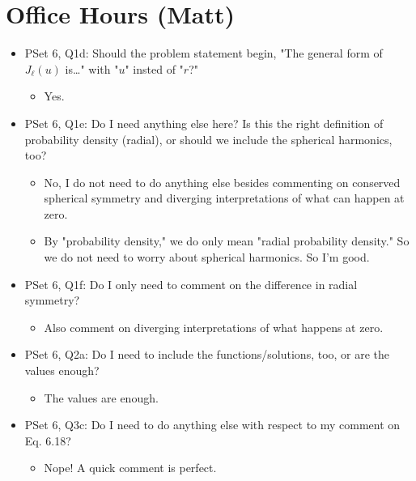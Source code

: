 \documentclass[../notes.tex]{subfiles}
\begin{document}
\section{Office Hours (Matt)}
\begin{itemize}
    \item PSet 6, Q1d: Should the problem statement begin, "The general form of $J_\ell(u)$ is\dots" with "$u$" insted of "$r$?"
    \begin{itemize}
        \item Yes.
    \end{itemize}
    \item PSet 6, Q1e: Do I need anything else here? Is this the right definition of probability density (radial), or should we include the spherical harmonics, too?
    \begin{itemize}
        \item No, I do not need to do anything else besides commenting on conserved spherical symmetry and diverging interpretations of what can happen at zero.
        \item By "probability density," we do only mean "radial probability density." So we do not need to worry about spherical harmonics. So I'm good.
    \end{itemize}
    \item PSet 6, Q1f: Do I only need to comment on the difference in radial symmetry?
    \begin{itemize}
        \item Also comment on diverging interpretations of what happens at zero.
    \end{itemize}
    \item PSet 6, Q2a: Do I need to include the functions/solutions, too, or are the values enough?
    \begin{itemize}
        \item The values are enough.
    \end{itemize}
    \item PSet 6, Q3c: Do I need to do anything else with respect to my comment on Eq. 6.18?
    \begin{itemize}
        \item Nope! A quick comment is perfect.
    \end{itemize}
\end{itemize}
\end{document}
